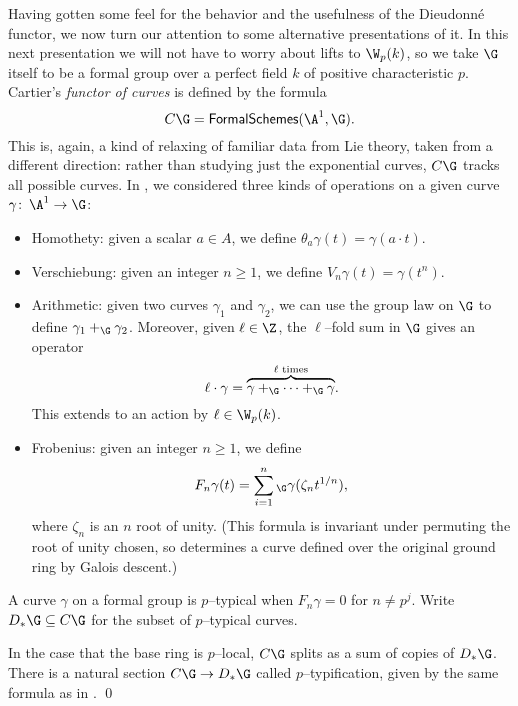 Having gotten some feel for the behavior and the usefulness of the Dieudonn\'e functor, we now turn our attention to some alternative presentations of it.  In this next presentation we will not have to worry about lifts to $\W_p(k)$, so we take $\G$ itself to be a formal group over a perfect field $k$ of positive characteristic $p$.  Cartier's \textit{functor of curves} is defined by the formula \[C\G = \CatOf{FormalSchemes}(\A^1, \G).\]  This is, again, a kind of relaxing of familiar data from Lie theory, taken from a different direction: rather than studying just the exponential curves, $C\G$ tracks all possible curves.  In , we considered three kinds of operations on a given curve $\gamma\co \A^1 \to \G$:
\begin{itemize}
\item Homothety: given a scalar $a \in A$, we define $\theta_a \gamma(t) = \gamma(a \cdot t)$.
\item Verschiebung: given an integer $n \ge 1$, we define $V_n \gamma(t) = \gamma(t^n)$.
\item Arithmetic: given two curves $\gamma_1$ and $\gamma_2$, we can use the group law on $\G$ to define $\gamma_1 +_{\G} \gamma_2$.  Moreover, given $\ell \in \Z$, the $\ell$--fold sum in $\G$ gives an operator \[\ell \cdot \gamma = \overset{\text{$\ell$ times}}{\overbrace{\gamma +_{\G} \cdots +_{\G} \gamma}}.\]  This extends to an action by $\ell \in \W_p(k)$.
\item Frobenius: given an integer $n \ge 1$, we define \[F_n \gamma(t) = \sum_{i=1}^n{}_{\G} \gamma(\zeta_n t^{1/n}),\] where $\zeta_{n}$ is an $n${\th} root of unity.  (This formula is invariant under permuting the root of unity chosen, so determines a curve defined over the original ground ring by Galois descent.)
\end{itemize}

\begin{definition}
A curve $\gamma$ on a formal group is $p$--typical when $F_n \gamma = 0$ for $n \ne p^j$.  Write $D_*\G \subseteq C\G$ for the subset of $p$--typical curves.
\end{definition}

\begin{lemma}
In the case that the base ring is $p$--local, $C\G$ splits as a sum of copies of $D_* \G$.  There is a natural section $C\G \to D_* \G$ called $p$--typification, given by the same formula as in . \qed
\end{lemma}

